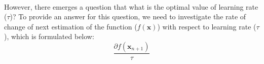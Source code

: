 \documentclass[letterpaper,12pt]{article}
\begin{document}
\paragraph{} However, there emerges a question that what is the optimal value of learning rate ($\tau$)? To provide an answer for this question, we need to investigate the rate of change of next estimation of the function ($f(\mathbf{x})$) with respect to learning rate ($\tau$), which is formulated below:
\begin{equation*}
   
\frac{\partial f(\mathbf{x}_{n+1})}{\tau}

\end{equation*}
\end{document}
